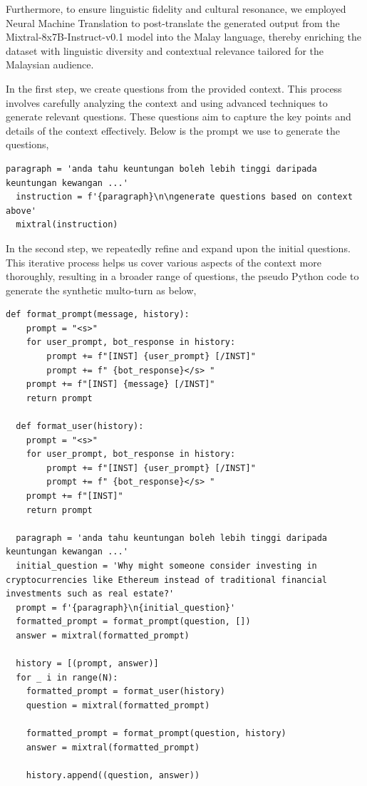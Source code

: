\documentclass[preprint]{article}
\begin{document}
Furthermore, to ensure linguistic fidelity and cultural resonance, we employed Neural Machine Translation to post-translate the generated output from the Mixtral-8x7B-Instruct-v0.1 model into the Malay language, thereby enriching the dataset with linguistic diversity and contextual relevance tailored for the Malaysian audience.

In the first step, we create questions from the provided context. This process involves carefully analyzing the context and using advanced techniques to generate relevant questions. These questions aim to capture the key points and details of the context effectively. Below is the prompt we use to generate the questions,

\begin{lstlisting}[breaklines=true]
  paragraph = 'anda tahu keuntungan boleh lebih tinggi daripada keuntungan kewangan ...'
  instruction = f'{paragraph}\n\ngenerate questions based on context above'
  mixtral(instruction)
\end{lstlisting}

In the second step, we repeatedly refine and expand upon the initial questions. This iterative process helps us cover various aspects of the context more thoroughly, resulting in a broader range of questions, the pseudo Python code to generate the synthetic multo-turn as below,

\begin{lstlisting}[breaklines=true]
  def format_prompt(message, history):
    prompt = "<s>"
    for user_prompt, bot_response in history:
        prompt += f"[INST] {user_prompt} [/INST]"
        prompt += f" {bot_response}</s> "
    prompt += f"[INST] {message} [/INST]"
    return prompt

  def format_user(history):
    prompt = "<s>"
    for user_prompt, bot_response in history:
        prompt += f"[INST] {user_prompt} [/INST]"
        prompt += f" {bot_response}</s> "
    prompt += f"[INST]"
    return prompt
  
  paragraph = 'anda tahu keuntungan boleh lebih tinggi daripada keuntungan kewangan ...'
  initial_question = 'Why might someone consider investing in cryptocurrencies like Ethereum instead of traditional financial investments such as real estate?'
  prompt = f'{paragraph}\n{initial_question}'
  formatted_prompt = format_prompt(question, [])
  answer = mixtral(formatted_prompt)

  history = [(prompt, answer)]
  for _ i in range(N):
    formatted_prompt = format_user(history)
    question = mixtral(formatted_prompt)

    formatted_prompt = format_prompt(question, history)
    answer = mixtral(formatted_prompt)

    history.append((question, answer))

\end{lstlisting}
\end{document}
